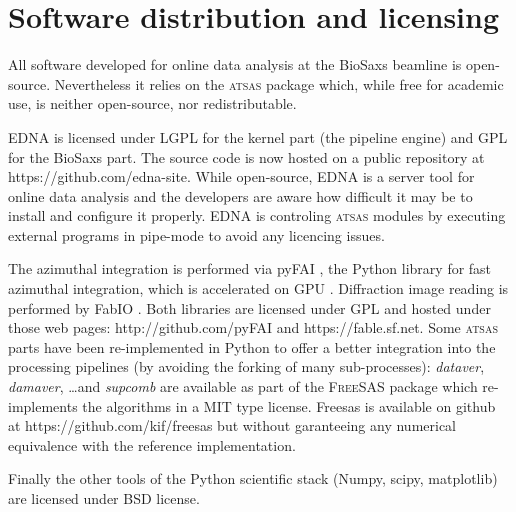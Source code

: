 \documentclass[preprint,pdf]{iucr}              %
\begin{document}





\section{Software distribution and licensing}

All software developed for online data analysis at the BioSaxs beamline is
open-source.
Nevertheless it relies on the \textsc{atsas} package which, while free for
academic use, is neither open-source, nor redistributable.

EDNA is licensed under LGPL for the kernel part (the pipeline engine) and GPL
for the BioSaxs part. The source code is now hosted on a public
repository at https://github.com/edna-site. While open-source, EDNA is a
server tool for online data analysis and the developers are aware how difficult
it may be to install and configure it properly. EDNA is controling
\textsc{atsas} modules by executing external programs in pipe-mode to avoid any
licencing issues.

The azimuthal integration is performed via pyFAI \cite{pyfai}, the Python library
for fast azimuthal integration, which is accelerated on GPU \cite{pyfai_gpu}.
Diffraction image reading is performed by FabIO \cite{fabio}.
Both libraries
are licensed under GPL and hosted under those web pages:
http://github.com/pyFAI and https://fable.sf.net.
Some \textsc{atsas} parts have been re-implemented in Python to offer a better
integration into the processing pipelines (by avoiding the forking of many
sub-processes): \textit{dataver}, \textit{damaver}, \ldots  and \textit{supcomb}
are available as part of the \textsc{FreeSAS} package which re-implements the
algorithms in a MIT type license. Freesas is available on github at
https://github.com/kif/freesas but without garanteeing any
numerical equivalence with the reference implementation.

Finally the other tools of the Python scientific stack (Numpy, scipy,
matplotlib) are licensed under BSD license.
\end{document}

